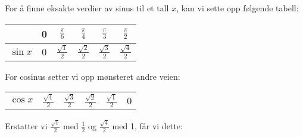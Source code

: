 



\begin{comment}
	\chapter*{Vedlegg A-H \label{Tips} \addcontentsline{toc}{chapter}{Vedlegg A-H}}
	\vspace{20 pt}
\end{comment}	
\renewcommand{\headwidth}{13cm}	
\eqlen
{}	
For å finne eksakte verdier av sinus til et tall $ x $, kan vi sette opp følgende tabell:\vs \renewcommand{\arraystretch}{1.5}	
\begin{center}
	\begin{tabular}{l|c|c|c|c|c|}
		& 0&$\frac{\pi}{6}$ & $\frac{\pi}{4}$ &$\frac{\pi}{3}$ & $\frac{\pi}{2}$    \\
		\hline
		$\sin x$ & 0 &$\frac{\sqrt{1}}{2}$ & $\frac{\sqrt{2}}{2}$ & $\frac{\sqrt{3}}{2}$ & $ \frac{\sqrt{4}}{2} $ \\
	\end{tabular}
\end{center}
For cosinus setter vi opp mønsteret andre veien:
\begin{center}
	\begin{tabular}{l|c|c|c|c|c}
		$\cos x$ & $\frac{\sqrt{4}}{2}  $ & $\frac{\sqrt{3}}{2}$ & $\frac{\sqrt{2}}{2}$ & $\frac{\sqrt{1}}{2}$ & 0 \\
	\end{tabular}
\end{center}
Erstatter vi $ {\frac{\sqrt{1}}{2}} $ med $ \frac{1}{2} $ og $ \frac{\sqrt{4}}{2} $ med 1, får vi dette:

